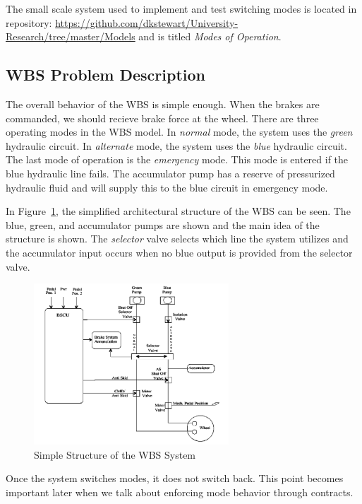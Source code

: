 \documentclass{article}
\begin{document}
The small scale system used to implement and test switching modes is located in repository: \url{https://github.com/dkstewart/University-Research/tree/master/Models} and is titled \textit{Modes of Operation}.

\subsection{WBS Problem Description}
The overall behavior of the WBS is simple enough. When the brakes are commanded, we should recieve brake force at the wheel. There are three operating modes in the WBS model. In \textit{normal} mode, the system uses the \textit{green} hydraulic circuit. In \textit{alternate} mode, the system uses the \textit{blue} hydraulic circuit. The last mode of operation is the \textit{emergency} mode. This mode is entered if the blue hydraulic line fails. The accumulator pump has a reserve of pressurized hydraulic fluid and will supply this to the blue circuit in emergency mode.

In Figure~\ref{fig:wbs}, the simplified architectural structure of the WBS can be seen. The blue, green, and accumulator pumps are shown and the main idea of the structure is shown. The \textit{selector} valve selects which line the system utilizes and the accumulator input occurs when no blue output is provided from the selector valve. 

\begin{figure}[h]
\begin{center}
\includegraphics[width=0.65\textwidth]{images/wbs_arp4761} 
\caption{Simple Structure of the WBS System}
\label{fig:wbs}
\end{center}
\end{figure}

Once the system switches modes, it does not switch back. This point becomes important later when we talk about enforcing mode behavior through contracts.
\end{document}
